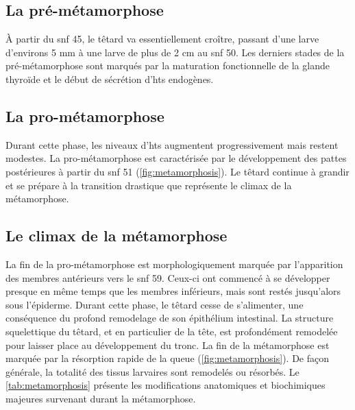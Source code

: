 \documentclass[../main.tex]{subfiles}
\begin{document}
\subsection{La pré-métamorphose}
À partir du \gls{snf} 45, le têtard va essentiellement croître, passant d'une larve d'environs 5 mm à une larve de plus de 2 cm au \gls{snf} 50.
Les derniers stades de la pré-métamorphose sont marqués par la maturation fonctionnelle de la glande thyroïde et le début de sécrétion d'\glspl{ht} endogènes.

\subsection{La pro-métamorphose}
Durant cette phase, les niveaux d'\glspl{ht} augmentent progressivement mais restent modestes.
La pro-métamorphose est caractérisée par le développement des pattes postérieures à partir du \gls{snf} 51 (\autoref{fig:metamorphosis}).
Le têtard continue à grandir et se prépare à la transition drastique que représente le climax de la métamorphose.



\subsection{Le climax de la métamorphose}
La fin de la pro-métamorphose est morphologiquement marquée par l'apparition des membres antérieurs vers le \gls{snf} 59.
Ceux-ci ont commencé à se développer presque en même temps que les membres inférieurs, mais sont restés jusqu'alors sous l'épiderme.
Durant cette phase, le têtard cesse de s'alimenter, une conséquence du profond remodelage de son épithélium intestinal.
La structure squelettique du têtard, et en particulier de la tête, est profondément remodelée pour laisser place au développement du tronc.
La fin de la métamorphose est marquée par la résorption rapide de la queue (\autoref{fig:metamorphosis}).
De façon générale, la totalité des tissus larvaires sont remodelés ou résorbés. Le \autoref{tab:metamorphosis} présente les modifications anatomiques et biochimiques majeures survenant durant la métamorphose.


\end{document}
